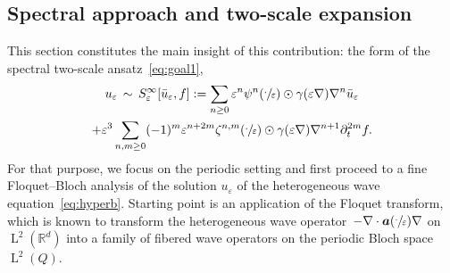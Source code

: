 \documentclass[JEP,XML,SOM,Unicode,published]{cedram}
\theoremstyle{plain}
\theoremstyle{definition}
\numberwithin{equation}{section}
\newcommand{\e}{\varepsilon}
\newcommand{\R}{\mathbb R}
\newcommand{\Aa}{\boldsymbol a}
\newcommand{\Ld}{\operatorname{L}}
\begin{document}
\subsection{Spectral approach and two-scale expansion}\label{sec:Bloch}
This section constitutes the main insight of this contribution: the form of the spectral two-scale ansatz~\eqref{eq:goal1},
\begin{multline}\label{eq:spectral-Ansatz}
u_\e\,\sim\,S^\infty_\e[\bar u_\e,f]:=\sum_{n\ge0}\e^n\psi^n(\sfrac\cdot\e)\odot\gamma(\e\nabla)\nabla^n\bar u_\e\\
+\e^3\sum_{n,m\ge0}(-1)^m\e^{n+2m}\zeta^{n,m}(\sfrac\cdot\e)\odot\gamma(\e\nabla)\nabla^{n+1}\partial_t^{2m}f.
\end{multline}
For that purpose, we focus on the periodic setting and first proceed to a fine Floquet--Bloch analysis of the solution $u_\e$ of the heterogeneous wave equation~\eqref{eq:hyperb}.
Starting point is an application of the Floquet transform, which is known to transform the heterogeneous wave operator~\mbox{$-\nabla\cdot\Aa(\sfrac\cdot\e)\nabla$} on $\Ld^2(\R^d)$ into a family of fibered wave operators on the periodic Bloch space $\Ld^2(Q)$.
\end{document}
